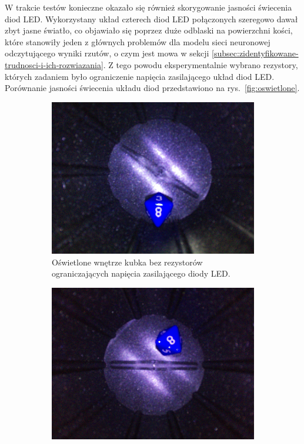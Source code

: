 W trakcie testów konieczne okazało się również skorygowanie jasności świecenia diod LED. Wykorzystany układ czterech diod LED połączonych szeregowo dawał zbyt jasne światło, 
co objawiało się poprzez duże odblaski na powierzchni kości, które stanowiły jeden z głównych problemów dla modelu sieci neuronowej odczytującego wyniki rzutów, o czym jest mowa
w sekcji \ref{subsec:zidentyfikowane-trudnosci-i-ich-rozwiazania}. Z tego powodu eksperymentalnie wybrano rezystory, których zadaniem było
ograniczenie napięcia zasilającego układ diod LED. Porównanie jasności świecenia układu diod przedstawiono na rys.~\ref{fig:oswietlone}.

\begin{figure}[H]
    \centering
    \begin{subfigure}{0.48\textwidth}
        \centering
        \includegraphics[width=\linewidth]{chapters/03-praca-wlasna/figures/za jasno.jpg}
        \caption{\label{fig:za jasno}Oświetlone wnętrze kubka bez rezystorów ograniczających napięcia zasilającego diody LED.}
    \end{subfigure}
    \hfill
    \begin{subfigure}{0.48\textwidth}
        \centering
        \includegraphics[width=\linewidth]{chapters/03-praca-wlasna/figures/w sam raz.jpg}

\end{subfigure}
\end{figure}
